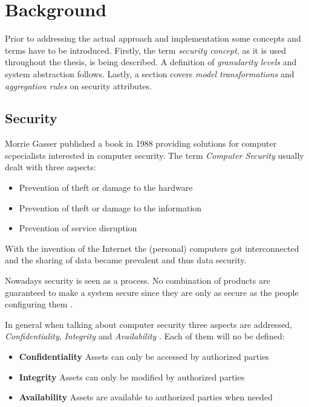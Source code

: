 
\newpage
\section{Background}

Prior to addressing the actual approach and implementation some concepts and terms have to be introduced. Firstly, the term \textit{security concept}, as it is used throughout the thesis, is being described. A definition of \textit{granularity levels} and system abstraction follows. Lastly, a section covers \textit{model transformations} and \textit{aggregation rules} on security attributes.

\subsection{Security}

Morrie Gasser \cite{Gasser} published a book in 1988 providing solutions for computer scpecialists interested in computer security. The term \textit{Computer Security} usually dealt with three aspects:

\begin{itemize}
\item Prevention of theft or damage to the hardware 
\item Prevention of theft or damage to the information
\item Prevention of service disruption
\end{itemize}

With the invention of the Internet the (personal) computers got interconnected and the sharing of data became prevalent and thus data security.

Nowadays security is seen as a process. No combination of products are guaranteed to make a system secure since they are only as secure as the people configuring them \cite{vacca2012computer}. \label{sec:security}

In general when talking about computer security three aspects are addressed, \textit{Confidentiality}, \textit{Integrity} and \textit{Availability} \cite{Pfleeger:2006:SC:1177321}. Each of them will no be defined:

\begin{itemize}
\item[] \textbf{Confidentiality} Assets can only be accessed by authorized parties
\item[] \textbf{Integrity} Assets can only be modified by authorized parties
\item[] \textbf{Availability} Assets are available to authorized parties when needed
\end{itemize} 

